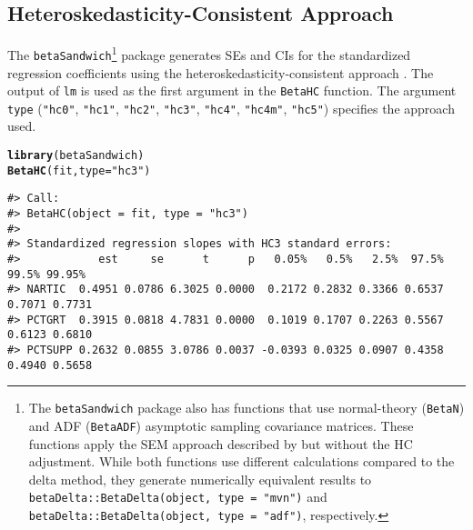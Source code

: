\documentclass[man]{apa7}\usepackage[]{graphicx}\usepackage[]{xcolor}
\makeatletter
\newcommand{\hlstr}[1]{\textcolor[rgb]{0.192,0.494,0.8}{#1}}%
\newcommand{\hlstd}[1]{\textcolor[rgb]{0.345,0.345,0.345}{#1}}%
\newcommand{\hlkwc}[1]{\textcolor[rgb]{0.333,0.667,0.333}{#1}}%
\newcommand{\hlkwd}[1]{\textcolor[rgb]{0.737,0.353,0.396}{\textbf{#1}}}%
\newenvironment{kframe}{%
 \def\at@end@of@kframe{}%
 \ifinner\ifhmode%
  \def\at@end@of@kframe{\end{minipage}}%
  \begin{minipage}{\columnwidth}%
 \fi\fi%
 \def\FrameCommand##1{\hskip\@totalleftmargin \hskip-\fboxsep
 \colorbox{shadecolor}{##1}\hskip-\fboxsep
     \hskip-\linewidth \hskip-\@totalleftmargin \hskip\columnwidth}%
 \MakeFramed {\advance\hsize-\width
   \@totalleftmargin\z@ \linewidth\hsize
   \@setminipage}}%
 {\par\unskip\endMakeFramed%
 \at@end@of@kframe}
\newenvironment{knitrout}{}{} %
\makeatother
\begin{document}
\subsection{Heteroskedasticity-Consistent Approach}

The \texttt{betaSandwich}\footnote{The \texttt{betaSandwich} package also has functions that use normal-theory (\texttt{BetaN}) and ADF (\texttt{BetaADF}) asymptotic sampling covariance matrices. These functions apply the SEM approach described by \Textcite{Lib-Regression-Standardized-Coefficients-HC-Dudgeon-2017} but without the HC adjustment. While both functions use different calculations compared to the delta method, they generate numerically equivalent results to \texttt{betaDelta::BetaDelta(object, type = "mvn")} and \texttt{betaDelta::BetaDelta(object, type = "adf")}, respectively.} package generates SEs and CIs for the standardized regression coefficients using the heteroskedasticity-consistent approach \parencite{Lib-Regression-Standardized-Coefficients-HC-Dudgeon-2017}. The output of \texttt{lm} is used as the first argument in the \texttt{BetaHC} function. The argument \texttt{type} (\texttt{"hc0"}, \texttt{"hc1"}, \texttt{"hc2"}, \texttt{"hc3"}, \texttt{"hc4"}, \texttt{"hc4m"}, \texttt{"hc5"}) specifies the approach used.

\vspace{-.5em}
\begin{minipage}{.75\linewidth}
	\singlespacing
\begin{knitrout}\scriptsize
{}\color{fgcolor}\begin{kframe}
\begin{alltt}
\hlkwd{library}\hlstd{(betaSandwich)}
\hlkwd{BetaHC}\hlstd{(fit,} \hlkwc{type} \hlstd{=} \hlstr{"hc3"}\hlstd{)}
\end{alltt}
\begin{verbatim}
#> Call:
#> BetaHC(object = fit, type = "hc3")
#> 
#> Standardized regression slopes with HC3 standard errors:
#>            est     se      t      p   0.05%   0.5%   2.5%  97.5%  99.5% 99.95%
#> NARTIC  0.4951 0.0786 6.3025 0.0000  0.2172 0.2832 0.3366 0.6537 0.7071 0.7731
#> PCTGRT  0.3915 0.0818 4.7831 0.0000  0.1019 0.1707 0.2263 0.5567 0.6123 0.6810
#> PCTSUPP 0.2632 0.0855 3.0786 0.0037 -0.0393 0.0325 0.0907 0.4358 0.4940 0.5658
\end{verbatim}
\end{kframe}
\end{knitrout}
\end{minipage}
\end{document}
